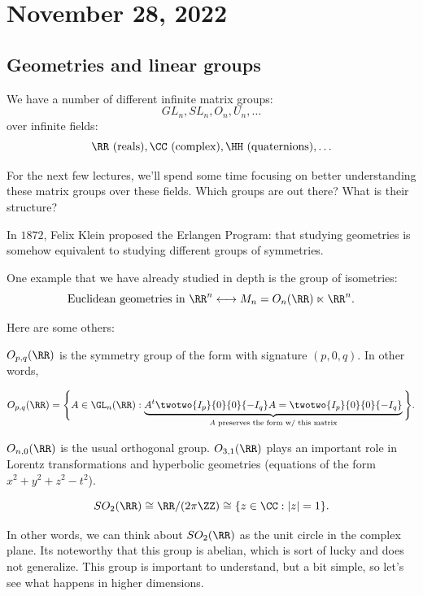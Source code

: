 \section{November 28, 2022}

\subsection{Geometries and linear groups}

We have a number of different infinite matrix groups:
\[GL_n, SL_n, O_n, U_n,\hdots\] 
over infinite fields:
\[\RR\text{ (reals)}, \CC\text{ (complex)}, \HH\text{ (quaternions)}, \hdots \]

For the next few lectures, we'll spend some time focusing on better understanding these matrix groups over these fields. Which groups are out there? What is their structure?

In $1872$, Felix Klein proposed the \ac{Erlangen Program}: that studying geometries is somehow equivalent to studying different groups of symmetries. 

One example that we have already studied in depth is the group of isometries: 
\[\text{Euclidean geometries in }\RR^n \longleftrightarrow M_n = O_n(\RR)\ltimes \RR^n.\]

Here are some others:

\begin{example}
\exlabel 

$O_{p,q}(\RR)$ is the symmetry group of the form with signature $(p,0,q)$. In other words, 

\[O_{p,q}(\RR) = \Bigg\{A \in \GL_n(\RR) : \underbrace{A^t\twotwo{I_p}{0}{0}{-I_q}A = \twotwo{I_p}{0}{0}{-I_q}}_{A\text{ preserves the form w/ this matrix}}\Bigg\}.\]
\end{example}

$O_{n,0}(\RR)$ is the usual orthogonal group. $O_{3,1}(\RR)$ plays an important role in Lorentz transformations and hyperbolic geometries (equations of the form $x^2+y^2+z^2-t^2$). 

\begin{example}
\exlabel
\[SO_2(\RR)\cong \RR/(2\pi \ZZ) \cong \{z\in \CC : \vert z\vert =1\}.\]
\end{example}

In other words, we can think about $SO_2(\RR)$ as the unit circle in the complex plane. Its noteworthy that this group is abelian, which is sort of lucky and does not generalize. This group is important to understand, but a bit simple, so let's see what happens in higher dimensions.

